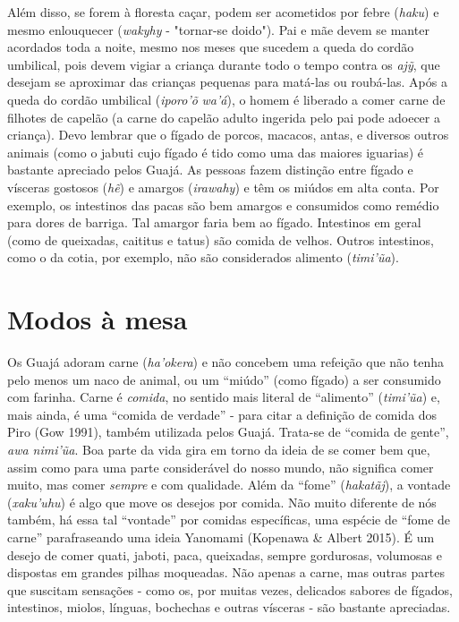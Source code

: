 Além disso, se forem à floresta caçar, podem ser acometidos por febre
(\emph{haku}) e mesmo enlouquecer (\emph{wakyhy} - "tornar-se doido").
Pai e mãe devem se manter acordados toda a noite, mesmo nos meses que
sucedem a queda do cordão umbilical, pois devem vigiar a criança durante
todo o tempo contra os \emph{ajỹ}, que desejam se aproximar das crianças
pequenas para matá-las ou roubá-las. Após a queda do cordão umbilical
(\emph{iporo'õ} \emph{wa'á}), o homem é liberado a comer carne de
filhotes de capelão (a carne do capelão adulto ingerida pelo pai pode
adoecer a criança). Devo lembrar que o fígado de porcos, macacos, antas,
e diversos outros animais (como o jabuti cujo fígado é tido como uma das
maiores iguarias) é bastante apreciado pelos Guajá. As pessoas fazem
distinção entre fígado e vísceras gostosos (\emph{hẽ}) e amargos
(\emph{irawahy}) e têm os miúdos em alta conta. Por exemplo, os
intestinos das pacas são bem amargos e consumidos como remédio para
dores de barriga. Tal amargor faria bem ao fígado. Intestinos em geral
(como de queixadas, caititus e tatus) são comida de velhos. Outros
intestinos, como o da cotia, por exemplo, não são considerados alimento
(\emph{timi'ũa}).

\section{Modos à mesa}

Os Guajá adoram carne (\emph{ha'okera}) e não concebem uma refeição que
não tenha pelo menos um naco de animal, ou um ``miúdo'' (como fígado) a
ser consumido com farinha. Carne é \emph{comida}, no sentido mais
literal de ``alimento'' (\emph{timi'ũa}) e, mais ainda, é uma ``comida
de verdade'' - para citar a definição de comida dos Piro (Gow 1991),
também utilizada pelos Guajá. Trata-se de ``comida de gente'', \emph{awa
nimi'ũa}. Boa parte da vida gira em torno da ideia de se comer bem que,
assim como para uma parte considerável do nosso mundo, não significa
comer muito, mas comer \emph{sempre} e com qualidade. Além da ``fome''
(\emph{hakatãj}), a vontade (\emph{xaku'uhu}) é algo que move os desejos
por comida. Não muito diferente de nós também, há essa tal ``vontade''
por comidas específicas, uma espécie de ``fome de carne'' parafraseando
uma ideia Yanomami (Kopenawa \& Albert 2015). É um desejo de comer
quati, jaboti, paca, queixadas, sempre gordurosas, volumosas e dispostas
em grandes pilhas moqueadas. Não apenas a carne, mas outras partes que
suscitam sensações - como os, por muitas vezes, delicados sabores de
fígados, intestinos, miolos, línguas, bochechas e outras vísceras - são
bastante apreciadas.

